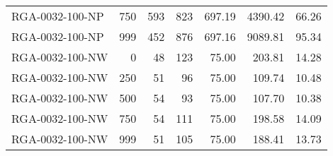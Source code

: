 \begin{table}[htbp]
{\begin{tabular}{lrrrrrr}
    RGA-0032-100-NP & 750    & 593    & 823    & 697.19 & 4390.42 & 66.26 \\
    RGA-0032-100-NP & 999    & 452    & 876    & 697.16 & 9089.81 & 95.34 \\ \hline
    RGA-0032-100-NW & 0      & 48     & 123    & 75.00  & 203.81 & 14.28 \\
    RGA-0032-100-NW & 250    & 51     & 96     & 75.00  & 109.74 & 10.48 \\
    RGA-0032-100-NW & 500    & 54     & 93     & 75.00  & 107.70 & 10.38 \\
    RGA-0032-100-NW & 750    & 54     & 111    & 75.00  & 198.58 & 14.09 \\
    RGA-0032-100-NW & 999    & 51     & 105    & 75.00  & 188.41 & 13.73 \\
    \bottomrule
    \end{tabular}}%
  \label{tab:addlabel}%
\end{table}%
